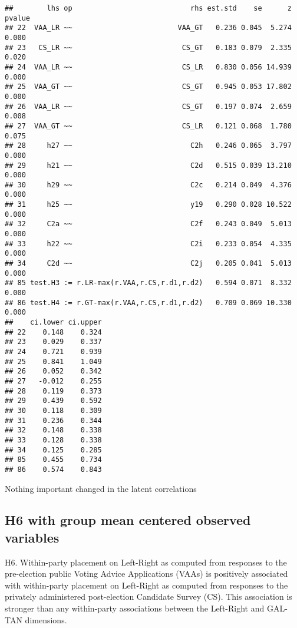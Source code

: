 \documentclass[
]{article}
\begin{document}
\begin{verbatim}
##        lhs op                            rhs est.std    se      z pvalue
## 22  VAA_LR ~~                         VAA_GT   0.236 0.045  5.274  0.000
## 23   CS_LR ~~                          CS_GT   0.183 0.079  2.335  0.020
## 24  VAA_LR ~~                          CS_LR   0.830 0.056 14.939  0.000
## 25  VAA_GT ~~                          CS_GT   0.945 0.053 17.802  0.000
## 26  VAA_LR ~~                          CS_GT   0.197 0.074  2.659  0.008
## 27  VAA_GT ~~                          CS_LR   0.121 0.068  1.780  0.075
## 28     h27 ~~                            C2h   0.246 0.065  3.797  0.000
## 29     h21 ~~                            C2d   0.515 0.039 13.210  0.000
## 30     h29 ~~                            C2c   0.214 0.049  4.376  0.000
## 31     h25 ~~                            y19   0.290 0.028 10.522  0.000
## 32     C2a ~~                            C2f   0.243 0.049  5.013  0.000
## 33     h22 ~~                            C2i   0.233 0.054  4.335  0.000
## 34     C2d ~~                            C2j   0.205 0.041  5.013  0.000
## 85 test.H3 := r.LR-max(r.VAA,r.CS,r.d1,r.d2)   0.594 0.071  8.332  0.000
## 86 test.H4 := r.GT-max(r.VAA,r.CS,r.d1,r.d2)   0.709 0.069 10.330  0.000
##    ci.lower ci.upper
## 22    0.148    0.324
## 23    0.029    0.337
## 24    0.721    0.939
## 25    0.841    1.049
## 26    0.052    0.342
## 27   -0.012    0.255
## 28    0.119    0.373
## 29    0.439    0.592
## 30    0.118    0.309
## 31    0.236    0.344
## 32    0.148    0.338
## 33    0.128    0.338
## 34    0.125    0.285
## 85    0.455    0.734
## 86    0.574    0.843
\end{verbatim}

Nothing important changed in the latent correlations

\newpage

\hypertarget{h6-with-group-mean-centered-observed-variables}{%
\subsection{H6 with group mean centered observed
variables}\label{h6-with-group-mean-centered-observed-variables}}

H6. Within-party placement on Left-Right as computed from responses to
the pre-election public Voting Advice Applications (VAAs) is positively
associated with within-party placement on Left-Right as computed from
responses to the privately administered post-election Candidate Survey
(CS). This association is stronger than any within-party associations
between the Left-Right and GAL-TAN dimensions.
\end{document}
